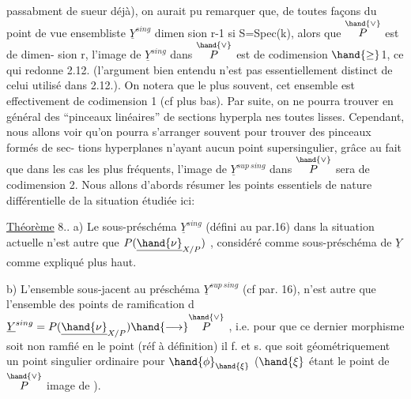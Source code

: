 
passabment de sueur déjà), on aurait pu remarquer que,  de
toutes façons du point de vue ensembliste $\underline{Y}^{sing}$  dimen%
sion r-1  si S=Spec(k), alors que $\overset{\hand{\vee}}{P}$ est de dimen-%
sion r,  l'image de $\underline{Y}^{sing}$ dans $\overset{\hand{\vee}}{P}$ est de codimension $\hand{\geq}$1, ce qui redonne
2.12. (l'argument bien entendu n'est pas essentiellement distinct de
celui utilisé dans 2.12.). On notera que le plus souvent, cet ensemble
est effectivement de codimension 1 (cf plus bas). Par suite, on ne
pourra trouver en général des ``pinceaux linéaires'' de sections hyperpla%
nes toutes   lisses. Cependant, nous allons voir qu'on
pourra s'arranger souvent pour  trouver des pinceaux formés de sec-%
tions hyperplanes n'ayant aucun point supersingulier, grâce au fait que
dans les cas les plus fréquents, l'image de $\underline{Y}^{sup\ sing}$ dans $\overset{\hand{\vee}}{P}$ sera de
codimension 2. Nous allons d'abords résumer les points essentiels
de nature différentielle de la situation étudiée ici:

\uline{Théorème} 8.. a) Le sous-préschéma $\underline{Y}^{sing}$ (défini au par.16) dans
la situation actuelle n'est autre que $P(\underline{\hand{\nu}}_{X/P})$ , considéré comme
sous-préschéma de $\underline{Y}$ comme expliqué plus haut.

b) L'ensemble sous-jacent au préschéma $\underline{Y}^{sup\ sing}$ (cf par. 16), 
 n'est autre que l'ensemble des points de ramification d 
$\underline{Y}^{sing} = P(\underline{\hand{\nu}}_{X/P}) \hand{\longrightarrow} \overset{\hand{\vee}}{P}$ , i.e. pour que ce dernier morphisme soit
non ramfié en le point  (réf à définition) il f. et s. que 
soit géométriquement un point singulier ordinaire pour $\hand{\phi}_{\hand{\xi}}$ ($\hand{\xi}$ étant le
point de $\overset{\hand{\vee}}{P}$ image de  ).

